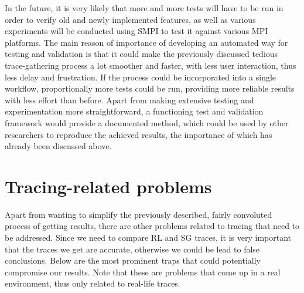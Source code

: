 In the future, it is very likely that more and more tests will have to
be run in order to verify old and newly implemented features, as well
as various experiments will be conducted using SMPI to test it against
various MPI platforms. The main reason of importance of developing an
automated way for testing and validation is that it could make the
previously discussed tedious trace-gathering process a lot smoother
and faster, with less user interaction, thus less delay and
frustration. If the process could be incorporated into a single
workflow, proportionally more tests could be run, providing more
reliable results with less effort than before. Apart from making
extensive testing and experimentation more straightforward, a
functioning test and validation framework would provide a
documented method, which could be used by other researchers to
reproduce the achieved results, the importance of which has already
been discussed above.
\section{Tracing-related problems}
Apart from wanting to simplify the previously described, fairly
convoluted process of getting results, there are other problems
related to tracing that need to be addressed. Since we need to compare
RL and SG traces, it is very important that the traces we get are
accurate, otherwise we could be lead to false conclusions. Below are
the most prominent traps that could potentially compromise our
results. Note that these are problems that come up in a real
environment, thus only related to real-life traces.
